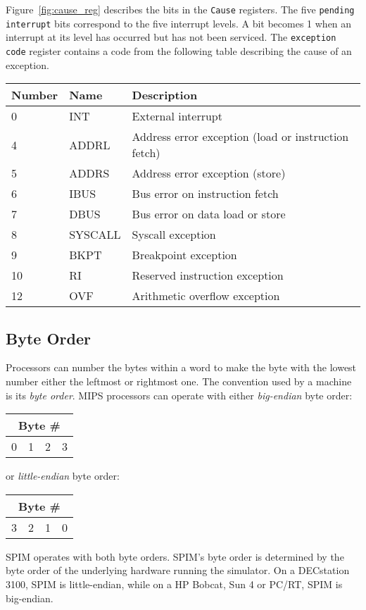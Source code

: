 \documentclass[11pt]{article}
\begin{document}
Figure~\ref{fig:cause_reg} describes the bits in the {\tt Cause}
registers.  The five {\tt pending interrupt} bits correspond to the
five interrupt levels.  A bit becomes 1 when an interrupt at its level
has occurred but has not been serviced.  The {\tt exception code}
register contains a code from the following table describing the cause
of an exception.
\begin{center}
  \small
  \begin{tabular}{|l|l|l|}
    \hline
    {\bf Number} & {\bf Name} & {\bf Description} \\
    \hline
    \hline
    0 & INT & External interrupt \\
    4 & ADDRL & Address error exception (load or instruction fetch) \\
    5 & ADDRS & Address error exception (store) \\
    6 & IBUS & Bus error on instruction fetch \\
    7 & DBUS & Bus error on data load or store \\
    8 & SYSCALL & Syscall exception \\
    9 & BKPT & Breakpoint exception \\
    10&  RI & Reserved instruction exception \\
    12&  OVF & Arithmetic overflow exception \\
    \hline
  \end{tabular}
\end{center}

\subsection{Byte Order}

Processors can number the bytes within a word to make the byte with
the lowest number either the leftmost or rightmost one.  The convention
used by a machine is its {\em byte order\/}.  MIPS processors can
operate with either {\em big-endian\/} byte order:
\begin{center}
  \begin{tabular}{|c|c|c|c|}
    \multicolumn{4}{c}{{\bf Byte \#}} \\
    \hline
    0 & 1 & 2 & 3 \\
    \hline
  \end{tabular}
\end{center}
or {\em little-endian\/} byte order:
\begin{center}
  \begin{tabular}{|c|c|c|c|}
    \multicolumn{4}{c}{{\bf Byte \#}} \\
    \hline
    3 & 2 & 1 & 0 \\
    \hline
  \end{tabular}
\end{center}
SPIM operates with both byte orders.  SPIM's byte order is determined
by the byte order of the underlying hardware running the simulator.
On a DECstation 3100, SPIM is little-endian, while on a HP Bobcat, Sun
4 or PC/RT, SPIM is big-endian.
\end{document}
